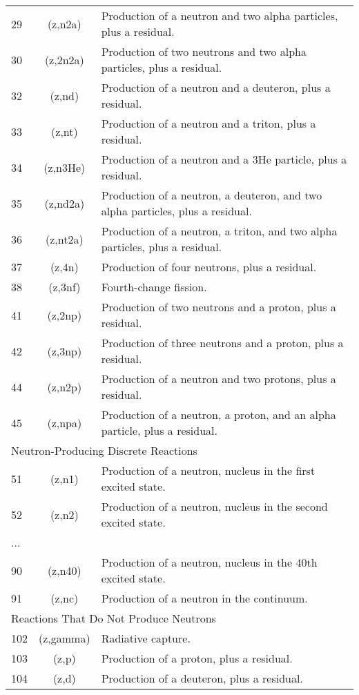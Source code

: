 \begin{table}[h]
\begin{tabular}{| l | c | l |}
29	& (z,n2a)	 &    Production of a neutron and two alpha particles, plus a residual.	\\
30	& (z,2n2a)	&   Production of two neutrons and two alpha particles, plus a residual.	\\
32	& (z,nd)	 &    Production of a neutron and a deuteron, plus a residual.	\\
33	& (z,nt)	 &    Production of a neutron and a triton, plus a residual.	\\
34	& (z,n3He)	&   Production of a neutron and a 3He particle, plus a residual.	\\
35	& (z,nd2a)	&   Production of a neutron, a deuteron, and two alpha particles, plus a residual.	\\
36	& (z,nt2a)	&   Production of a neutron, a triton, and two alpha particles, plus a residual.	\\
37	& (z,4n)	 &    Production of four neutrons, plus a residual.	\\
38	& (z,3nf)	 &    Fourth-change fission.	\\
41	& (z,2np)	 &    Production of two neutrons and a proton, plus a residual.	\\
42	& (z,3np)	 &    Production of three neutrons and a proton, plus a residual.	\\
44	& (z,n2p)	 &    Production of a neutron and two protons, plus a residual.	\\
45	& (z,npa)	 &    Production of a neutron, a proton, and an alpha particle, plus a residual.	\\
\hline
\multicolumn{3}{l}{ Neutron-Producing Discrete Reactions} \\
\hline
51	& (z,n1)	& Production of a neutron, nucleus in the first excited state.	\\
52	& (z,n2)	& Production of a neutron, nucleus in the second excited state.	\\
... & & \\
90	& (z,n40) &	Production of a neutron, nucleus in the 40th excited state.	\\
91	& (z,nc)	& Production of a neutron in the continuum.	\\
\hline
\multicolumn{3}{l}{Reactions That Do Not Produce Neutrons}\\
\hline
102	& (z,gamma) &	Radiative capture.	\\
103	& (z,p)	   & Production of a proton, plus a residual.          \\
104	& (z,d)	   & Production of a deuteron, plus a residual.        \\

\end{tabular}
\end{table}
